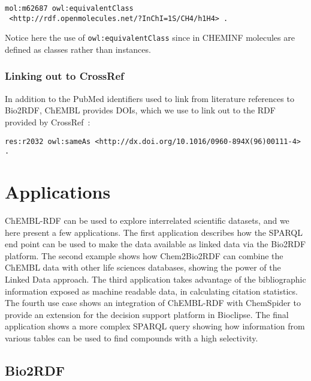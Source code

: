 \documentclass[10pt]{bmc_article}
\newenvironment{bmcformat}{\begin{raggedright}\baselineskip20pt\sloppy\setboolean{publ}{false}}{\end{raggedright}\baselineskip20pt\sloppy}
\begin{document}
\begin{bmcformat}
\begin{small}
\begin{verbatim}
mol:m62687 owl:equivalentClass
 <http://rdf.openmolecules.net/?InChI=1S/CH4/h1H4> .
\end{verbatim}
\end{small}

Notice here the use of \verb+owl:equivalentClass+ since in CHEMINF molecules are defined as
classes rather than instances.

\subsubsection*{Linking out to CrossRef}

In addition to the PubMed identifiers used to link from literature references to Bio2RDF,
ChEMBL provides DOIs, which we use to link out to the RDF provided by CrossRef~\cite{Bilder2011}:

\begin{small}
\begin{verbatim}
res:r2032 owl:sameAs <http://dx.doi.org/10.1016/0960-894X(96)00111-4> .
\end{verbatim}
\end{small}

\section*{Applications}

ChEMBL-RDF can be used to explore interrelated scientific datasets, and we here present a few applications. 
The first application describes how the SPARQL end point can be used to make the data available as linked data
via the Bio2RDF platform. The second example shows how Chem2Bio2RDF can combine the ChEMBL data
with other life sciences databases, showing the power of the Linked Data approach.
The third application takes advantage of the bibliographic information exposed as machine readable
data, in calculating citation statistics. The fourth use case shows an integration of ChEMBL-RDF with
ChemSpider to provide an extension for the decision support platform in Bioclipse. The final application
shows a more complex SPARQL query showing how information from various tables can be used to
find compounds with a high selectivity.

\subsection*{Bio2RDF}


\end{bmcformat}
\end{document}
